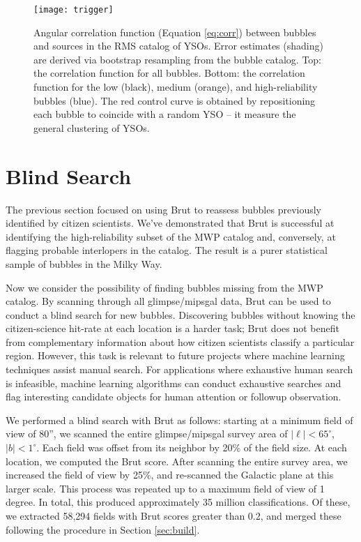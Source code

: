 \documentclass[preprint]{aastex}
\begin{document}
\begin{figure}[h!]
\texttt{[image: trigger]}
\caption{Angular correlation function (Equation \ref{eq:corr}) between bubbles and sources in the RMS catalog of YSOs. Error estimates (shading) are derived via bootstrap resampling from the bubble catalog. Top: the correlation function for all bubbles. Bottom: the correlation function for the
low (black), medium (orange), and high-reliability bubbles (blue). The red control curve is obtained by repositioning each bubble to coincide with a random YSO -- it measure the general clustering of YSOs.}
\label{fig:trigger}
\end{figure}

\section{Blind Search}
\label{sec:blind}
The previous section focused on using Brut to reassess bubbles previously identified by citizen scientists. We've demonstrated that Brut is successful at identifying the high-reliability subset of the MWP catalog and, conversely, at flagging probable interlopers in the catalog. The result is a purer statistical sample of bubbles in the Milky Way.

Now we consider the possibility of finding bubbles missing from the MWP catalog. By scanning through all {\sc glimpse}/{\sc mipsgal} data, Brut can be used to conduct a blind search for new bubbles. Discovering bubbles without knowing the citizen-science hit-rate at each location is a harder task; Brut does not benefit from complementary information about how citizen scientists classify a particular region. However, this task is relevant to future projects where machine learning techniques assist manual search. For applications where exhaustive human search is infeasible, machine learning algorithms can conduct exhaustive searches and flag interesting candidate objects for human attention or followup observation.

We performed a blind search with Brut as follows: starting at a minimum field of view of 80'', we scanned the entire {\sc glimpse}/{\sc mipsgal} survey area of $|\ell| < 65^\circ$, $|b| < 1^\circ$. Each field was offset from its neighbor by 20\% of the field size. At each location, we computed the Brut score. After scanning the entire survey area, we increased the field of view by 25\%, and re-scanned the Galactic plane at this larger scale. This process was repeated up to a maximum field of view of 1 degree. In total, this produced approximately 35 million classifications. Of these, we extracted 58,294 fields with Brut scores greater than 0.2, and merged these following the procedure in Section \ref{sec:build}. 
\end{document}
